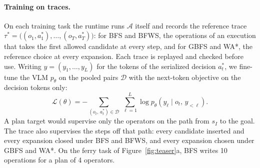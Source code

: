 \paragraph{Training on traces.} On each training task the runtime runs $\mathcal{A}$ itself and records the reference trace $\tau^*=\big((o_1,a^*_1),\dots,(o_T,a^*_T)\big)$: for BFS and BFWS, the operations of an execution that takes the first allowed candidate at every step, and for GBFS and WA*, the reference choice at every expansion. Each trace is replayed and checked before use. Writing $y=(y_1,\dots,y_L)$ for the tokens of the serialized decision $a^*_t$, we fine-tune the VLM $p_\theta$ on the pooled pairs $\mathcal{D}$ with the next-token objective on the decision tokens only:
\begin{equation}
\mathcal{L}(\theta) = -\sum_{(o_t,\,a^*_t)\in\mathcal{D}}\ \sum_{\ell=1}^{L} \log p_\theta\!\left(y_\ell \mid o_t,\, y_{<\ell}\right).
\label{eq:sft}
\end{equation}
A plan target would supervise only the operators on the path from $s_I$ to the goal. The trace also supervises the steps off that path: every candidate inserted and every expansion closed under BFS and BFWS, and every expansion chosen under GBFS and WA*. On the ferry task of Figure~\ref{fig:teaser}a, BFS writes 10 operations for a plan of 4 operators.

